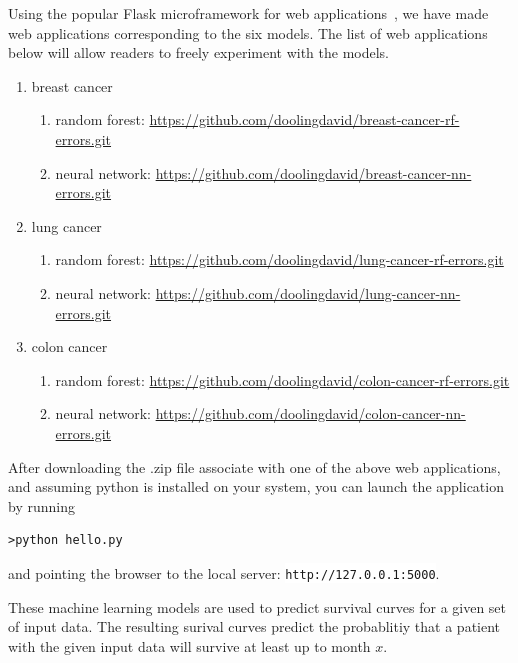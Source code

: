 \documentclass[10pt,letterpaper]{article}
\newcommand{\codewhite}[1]{\colorbox{white}{\texttt{#1}}}
\begin{document}
Using the popular Flask microframework for web applications~\cite{flask}, we have made web applications corresponding to the six models. The list of web applications below will allow readers to freely experiment with the models.

\begin{enumerate}[noitemsep]
\item breast cancer 
    \begin{enumerate}[noitemsep]
    \item random forest: \url{https://github.com/doolingdavid/breast-cancer-rf-errors.git}
    \item neural network: \url{https://github.com/doolingdavid/breast-cancer-nn-errors.git}
    \end{enumerate}
\item lung cancer
   \begin{enumerate}[noitemsep]
   \item random forest: \url{https://github.com/doolingdavid/lung-cancer-rf-errors.git}
   \item neural network: \url{https://github.com/doolingdavid/lung-cancer-nn-errors.git}
    \end{enumerate}
\item colon cancer
  \begin{enumerate}[noitemsep]
   \item random forest: \url{https://github.com/doolingdavid/colon-cancer-rf-errors.git}
   \item neural network: \url{https://github.com/doolingdavid/colon-cancer-nn-errors.git}
   \end{enumerate}
\end{enumerate}

After downloading the .zip file associate with one of the above web applications, and assuming 
python is installed on your system, you can launch the application by running
\begin{verbatim}
>python hello.py
\end{verbatim}
and pointing the browser to the local server: \codewhite{http://127.0.0.1:5000}.


These machine learning models are used to predict survival curves for a given set of input data. 
The resulting surival curves predict the probablitiy that a patient with the given input data will survive at least up to month $x$.
\end{document}
